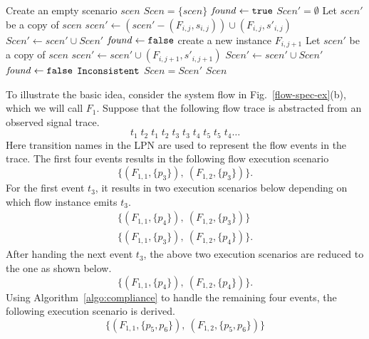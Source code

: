 \documentclass[conference]{IEEEtran}
\begin{document}
\begin{algorithm}[ht]
\DontPrintSemicolon
Create an empty scenario $scen$\;
$\mathit{Scen} = \{scen\}$\;
 {
	$\mathit{found} \gets {\tt true}$ \;
	$Scen' = \emptyset$\;
	 {
  		 {
    		 {
				Let $scen'$ be a copy of $scen$\;
      		$\mathit{scen'} \gets (\mathit{scen'} - (F_{i,j}, s_{i,j})) \cup (F_{i,j}, s'_{i,j})$\;
      		$\mathit{Scen'} \gets \mathit{scen'} \cup \mathit{Scen'}$\;
      		$\mathit{found} \gets {\tt false}$ \;
    		}
  		}
  		 {
      	create a new instance $F_{i, j+1}$ \;
      	 {
    			Let $scen'$ be a copy of $scen$\;
				$\mathit{scen'} \gets \mathit{scen'} \cup (F_{i,j+1}, s'_{i,j+1})$ \;
				$\mathit{Scen'} \gets \mathit{scen'} \cup \mathit{Scen'}$\;
        		$\mathit{found} \gets {\tt false}$ \;
      	}
    	}
	}
   {
    \Return ${\tt Inconsistent}$\;
  }
  $Scen = Scen'$\;
}
\Return $\mathit{Scen}$ \;
\caption{$\textsc{Check-Compliance}(\vec{F}, \, \rho)$}
\label{algo:compliance}
\end{algorithm}

To illustrate the basic idea, consider the system flow in
Fig.~\ref{flow-spec-ex}(b), which we will call $F_1$.
Suppose that the following flow trace is abstracted from an
observed signal trace.
\[
	t_1\;t_2\;t_1\;t_2\;t_3\;t_3\;t_4\;t_5\;t_5\;t_4\ldots
\]  
Here transition names in the LPN are used to represent the 
flow events in the trace.  The first four events results in
the following flow execution scenario
\[
	\{(F_{1,1}, \{p_3\}),~(F_{1,2}, \{p_3\})\}.
\]
For the first event $t_3$, it results in two execution scenarios 
below depending on which flow instance emits $t_3$.
\[
\begin{array}{l}
	\{(F_{1,1}, \{p_4\}),~(F_{1,2}, \{p_3\})\} \\
	\{(F_{1,1}, \{p_3\}),~(F_{1,2}, \{p_4\})\}.
\end{array}
\]
After handing the next event $t_3$, the above two execution scenarios
are reduced to the one as shown below.
\[
	\{(F_{1,1}, \{p_4\}),~(F_{1,2}, \{p_4\})\}.
\]
Using Algorithm~\ref{algo:compliance} to handle the
remaining four events, the following execution scenario is
derived.
\[
	\{(F_{1,1}, \{p_5, p_6\}),~(F_{1,2}, \{p_5, p_6\})\}
\]
\end{document}
